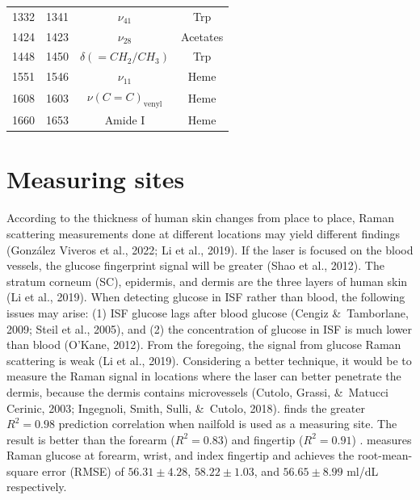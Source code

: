 \begin{table}[]
\begin{center}
\begin{tabular}{cccc}
1332                 & 1341          & $\nu_{41}$                    & Trp                         \\
1424                 & 1423          & $\nu_{28}$                    & Acetates                    \\
1448                 & 1450          & $\delta(={CH}_{2}/{CH}_{3})$  & Trp                         \\
1551                 & 1546          & $\nu_{11}$                    & Heme                        \\
1608                 & 1603          & $\nu(C=C)_{\text{venyl}}$     & Heme                        \\
1660                 & 1653          & Amide I                       & Heme                        \\
\hline
\end{tabular}
\label{tab:bloodpeak}
\end{center}
\end{table}


\section{Measuring sites}
According to the thickness of human skin changes from place to place, Raman scattering measurements done at different locations may yield different findings (González Viveros et al., 2022; Li et al., 2019). If the laser is focused on the blood vessels, the glucose fingerprint signal will be greater (Shao et al., 2012). The stratum corneum (SC), epidermis, and dermis are the three layers of human skin (Li et al., 2019). When detecting glucose in ISF rather than blood, the following issues may arise: (1) ISF glucose lags after blood glucose (Cengiz \&\ Tamborlane, 2009; Steil et al., 2005), and (2) the concentration of glucose in ISF is much lower than blood (O'Kane, 2012). From the foregoing, the signal from glucose Raman scattering is weak (Li et al., 2019). Considering a better technique, it would be to measure the Raman signal in locations where the laser can better penetrate the dermis, because the dermis contains microvessels (Cutolo, Grassi, \&\ Matucci Cerinic, 2003; Ingegnoli, Smith, Sulli, \&\ Cutolo, 2018).
\cite{ramanNailFold2019} finds the greater $R^2 = 0.98$ prediction correlation when nailfold is used as a measuring site.
The result is better than the forearm ($R^2 = 0.83$) \citep{forearm2005,forearm2014} and fingertip ($R^2 = 0.91$) \citep{fingertip2011}.
\cite{sitecompare} measures Raman glucose at forearm, wrist, and index fingertip and achieves the root-mean-square error (RMSE) of $56.31\pm4.28$, $58.22\pm1.03$, and $56.65\pm8.99$ ml/dL respectively.


